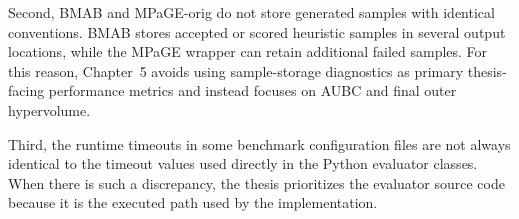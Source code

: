 \documentclass[../main.tex]{subfiles}
\begin{document}
Second, BMAB and MPaGE-orig do not store generated samples with identical conventions. BMAB stores accepted or scored heuristic samples in several output locations, while the MPaGE wrapper can retain additional failed samples. For this reason, Chapter~5 avoids using sample-storage diagnostics as primary thesis-facing performance metrics and instead focuses on AUBC and final outer hypervolume.

Third, the runtime timeouts in some benchmark configuration files are not always identical to the timeout values used directly in the Python evaluator classes. When there is such a discrepancy, the thesis prioritizes the evaluator source code because it is the executed path used by the implementation.
\end{document}
